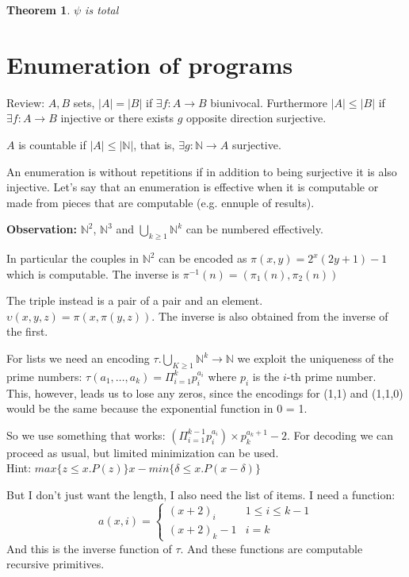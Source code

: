 \documentclass{amsbook}
\newcommand{\nat}{\ensuremath{\mathbb{N}}}
\newtheorem{theorem}{Theorem}[chapter]
\theoremstyle{definition}
\theoremstyle{remark}
\numberwithin{section}{chapter}
\numberwithin{equation}{chapter}
\begin{document}

\begin{theorem}{$\psi$ is total}

\end{theorem}


\chapter{Enumeration of programs}

Review: $ A, B $ sets, $ |A| = |B| $ if $ \exists f:A\rightarrow B $ biunivocal. Furthermore $ |A| \leq |B| $ if $ \exists f:A\rightarrow B $ injective or there exists $g$ opposite direction surjective.

$A$ is countable if $ |A| \leq |\nat| $, that is, $ \exists g: \nat \rightarrow A $ surjective.

An enumeration is without repetitions if in addition to being surjective it is also injective. Let's say that an enumeration is effective when it is computable or made from pieces that are computable (e.g. ennuple of results).

\textbf{Observation:} $ \nat^2 $, $ \nat^3 $ and $ \bigcup_{k\geq 1} \nat^k $ can be numbered effectively.

In particular the couples in $ \nat^2 $ can be encoded as $ \pi(x,y) = 2^x(2y+1)-1 $ which is computable. The inverse is $ \pi^{-1}(n) = (\pi_1(n), \pi_2(n)) $

The triple instead is a pair of a pair and an element. $ \upsilon (x,y,z) = \pi (x, \pi(y,z))$. The inverse is also obtained from the inverse of the first.

For lists we need an encoding $ \tau . \bigcup_{K \geq 1} \nat^k \rightarrow \nat $ we exploit the uniqueness of the prime numbers: $ \tau(a_1,\dots,a_k) = \Pi_{i=1}^k p_i^{a_i}$ where $ p_i $ is the $i$-th prime number.\\This, however, leads us to lose any zeros, since the encodings for (1,1) and (1,1,0) would be the same because the exponential function in 0 = 1.

So we use something that works: $ (\Pi_{i=1}^{k-1} p_i^{a_i}) \times p_k^{a_k+1} - 2$. For decoding we can proceed as usual, but limited minimization can be used.\\ Hint: $ max \{z \leq x . P(z)\} x - min\{\delta \leq x . P(x-\delta)\}$

But I don't just want the length, I also need the list of items. I need a function: \begin{equation*}
	a(x,i) = \begin{cases}
		(x+2)_i   & 1 \leq i \leq k-1 \\
		(x+2)_k-1 & i = k
	\end{cases}
\end{equation*}
And this is the inverse function of $\tau$. And these functions are computable recursive primitives.
\end{document}
